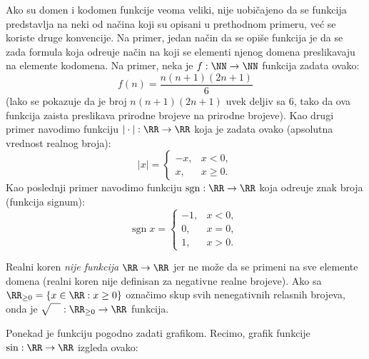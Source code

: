 \begin{EX}
  Ako su domen i kodomen funkcije veoma veliki, nije uobi\v cajeno da se funkcija predstavlja na neki od na\v cina koji
  su opisani u prethodnom primeru, ve\'c se koriste druge konvencije. Na primer, jedan na\v cin da se opi\v se
  funkcija je da se zada formula koja odre\dj uje na\v cin na koji se elementi njenog domena preslikavaju na elemente kodomena.
  Na primer, neka je $f : \NN \to \NN$ funkcija zadata ovako:
  $$
    f(n) = \frac{n(n + 1)(2n + 1)}{6}
  $$
  (lako se pokazuje da je broj $n(n + 1)(2n + 1)$ uvek deljiv sa 6, tako da ova funkcija zaista preslikava prirodne brojeve
  na prirodne brojeve). Kao drugi primer navodimo funkciju $| \cdot | : \RR \to \RR$ koja je zadata ovako
  (apsolutna vrednost realnog broja):
  $$
    |x| = \begin{cases}
      -x, & x < 0,\\
      x,  & x \ge 0.
    \end{cases}
  $$
  Kao poslednji primer navodimo funkciju $\mathrm{sgn} : \RR \to \RR$ koja odre\dj uje znak broja (funkcija signum):
  $$
    \mathrm{sgn} \; x = \begin{cases}
      -1, & x < 0,\\
       0, & x = 0,\\
       1, & x > 0.
    \end{cases}
  $$
\end{EX}

\begin{EX}
  Realni koren \emph{nije funkcija $\RR \to \RR$} jer ne mo\v ze da se primeni na sve elemente domena (realni koren
  nije definisan za negativne realne brojeve). Ako sa $\RR_{\ge 0} = \{x \in \RR : x \ge 0\}$ ozna\v cimo skup svih
  nenegativnih relasnih brojeva, onda je $\sqrt{\mathstrut\quad} : \RR_{\ge 0} \to \RR$ funkcija.
\end{EX}

\begin{EX}
  Ponekad je funkciju pogodno zadati grafikom. Recimo, grafik funkcije
  $\sin : \RR \to \RR$ izgleda ovako:
  \begin{center}
    
  \end{center}
\end{EX}

